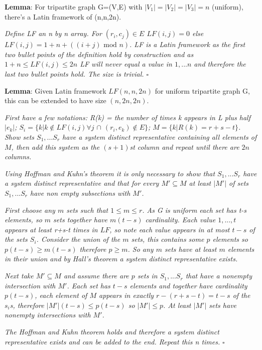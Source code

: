 \documentclass[a4paper,11pt]{report}
\newcounter{col}
\begin{document}
\textbf{Lemma}: For tripartite graph G=(V,E) with $|V_1|=|V_2|=|V_3|=n$ (uniform), there's a Latin framework of (n,n,2n).

\textit{Define LF an n by n array. For $(r_i,c_j)\in E$ $LF(i,j)=0$ else $LF(i,j)=1+n+((i+j)\text{ mod }n)$. LF is a Latin framework as the first two bullet points of the definition hold by construction and as $1+n\leq LF(i,j)\leq 2n$ LF will never equal a value in $1,...n$ and therefore the last two bullet points hold. The size is trivial. $\square$}

\textbf{Lemma}: Given Latin framework $LF(n,n,2n)$ for uniform tripartite graph G, this can be extended to have size $(n,2n,2n)$.

\textit{First have a few notations: R(k) = the number of times k appears in L plus half $|e_k|$; $S_i=\{k|k \not\in LF(i,j)\forall j$ $ \cap$ $ (r_i,e_k)\not\in E\}$; $M=\{k|R(k)=r+s-t\}$. Show sets $S_1,...S_r$ have a system distinct representative containing all elements of $M$, then add this system as the $(s+1)$st column and repeat until there are $2n$ columns.}

\textit{Using Hoffman and Kuhn's theorem \cite{hoffman} it is only necessary to show that $S_1,...S_r$ have a system distinct representative and that for every $M'\subseteq M$ at least $|M'|$ of sets $S_1,...S_r$ have non empty subsections with $M'$.}

\textit{First choose any $m$ sets such that $1\leq m \leq r$. As G is uniform each set has t-s elements, so $m$ sets together have $m(t-s)$ cardinality. Each value $1,...,t$ appears at least r+s-t times in $LF$, so note each value appears in at most $t-s$ of the sets $S_i$. Consider the union of the $m$ sets, this contains some $p$ elements so $p(t-s)\geq m(t-s)$ therefore $p\geq m$. So any $m$ sets have at least $m$ elements in their union and by Hall's theorem \cite{hall} a system distinct representative exists.}

\textit{Next take $M'\subseteq M$ and assume there are $p$ sets in $S_1,...S_r$ that have a nonempty intersection with $M'$. Each set has $t-s$ elements and together have cardinality $p(t-s)$, each element of $M$ appears in exactly $r-(r+s-t)=t-s$ of the $s_i$s, therefore $|M'|(t-s)\leq p(t-s)$ so $|M'|\leq p$. At least $|M'|$ sets have nonempty intersections with $M'$.}

\textit{The Hoffman and Kuhn theorem holds and therefore a system distinct representative exists and can be added to the end. Repeat this n times.} $\square$
\end{document}

